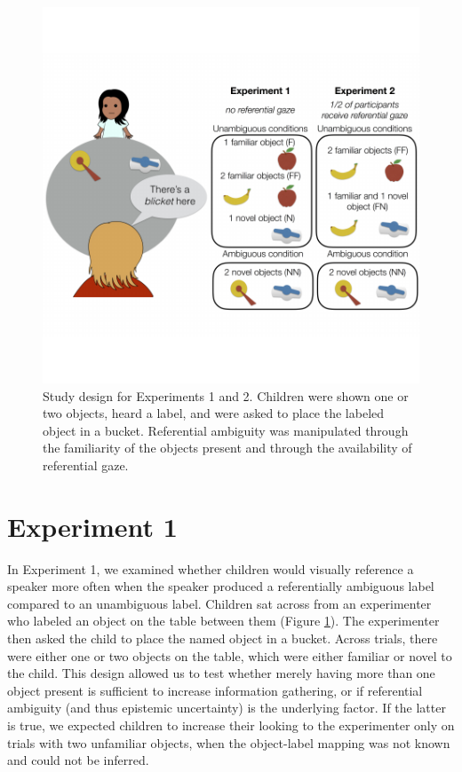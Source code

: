 \documentclass[english,,man]{apa6}
\begin{document}
\begin{figure}
\centering
\includegraphics{figs/design-1.pdf}
\caption{\label{fig:design}Study design for Experiments 1 and 2. Children
were shown one or two objects, heard a label, and were asked to place
the labeled object in a bucket. Referential ambiguity was manipulated
through the familiarity of the objects present and through the
availability of referential gaze.}
\end{figure}

\section{Experiment 1}\label{experiment-1}

In Experiment 1, we examined whether children would visually reference a
speaker more often when the speaker produced a referentially ambiguous
label compared to an unambiguous label. Children sat across from an
experimenter who labeled an object on the table between them (Figure
\ref{fig:design}). The experimenter then asked the child to place the
named object in a bucket. Across trials, there were either one or two
objects on the table, which were either familiar or novel to the child.
This design allowed us to test whether merely having more than one
object present is sufficient to increase information gathering, or if
referential ambiguity (and thus epistemic uncertainty) is the underlying
factor. If the latter is true, we expected children to increase their
looking to the experimenter only on trials with two unfamiliar objects,
when the object-label mapping was not known and could not be inferred.
\end{document}
